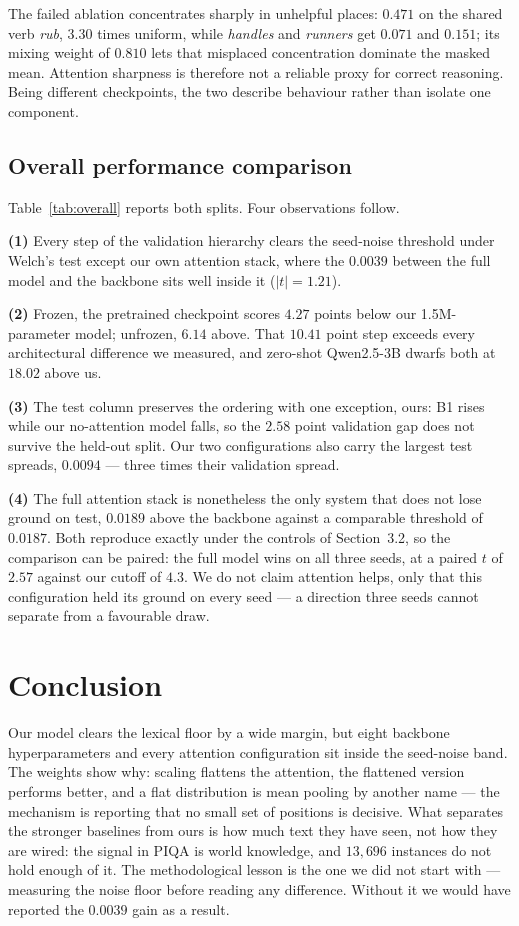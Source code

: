 \documentclass[11pt]{article}
\begin{document}
The failed ablation concentrates sharply in unhelpful places: $0.471$ on the
shared verb \emph{rub}, $3.30$ times uniform, while \emph{handles} and
\emph{runners} get $0.071$ and $0.151$; its mixing weight of $0.810$ lets that
misplaced concentration dominate the masked mean. Attention sharpness is
therefore not a reliable proxy for correct reasoning. Being different
checkpoints, the two describe behaviour rather than isolate one component.

\subsection{Overall performance comparison}

Table~\ref{tab:overall} reports both splits. Four observations follow.

\textbf{(1)} Every step of the validation hierarchy clears the seed-noise
threshold under Welch's test except our own attention stack, where the
$0.0039$ between the full model and the backbone sits well inside it
($|t|=1.21$).

\textbf{(2)} Frozen, the pretrained checkpoint scores $4.27$ points below our
1.5M-parameter model; unfrozen, $6.14$ above. That $10.41$ point step exceeds
every architectural difference we measured, and zero-shot Qwen2.5-3B dwarfs
both at $18.02$ above us.

\textbf{(3)} The test column preserves the ordering with one exception, ours:
B1 rises while our no-attention model falls, so the $2.58$ point validation
gap does not survive the held-out split. Our two configurations also carry
the largest test spreads, $0.0094$ --- three times their validation spread.

\textbf{(4)} The full attention stack is nonetheless the only system that
does not lose ground on test, $0.0189$ above the backbone against a comparable
threshold of $0.0187$. Both reproduce exactly under the controls of
Section~3.2, so the comparison can be paired: the full model wins on all three
seeds, at a paired $t$ of $2.57$ against our cutoff of $4.3$. We do not claim
attention helps, only that this configuration held its ground on every seed
--- a direction three seeds cannot separate from a favourable draw.

\section{Conclusion}

Our model clears the lexical floor by a wide margin, but eight backbone
hyperparameters and every attention configuration sit inside the seed-noise
band. The weights show why: scaling flattens the attention, the flattened
version performs better, and a flat distribution is mean pooling by another
name --- the mechanism is reporting that no small set of positions is
decisive. What separates the stronger baselines from ours is how much text
they have seen, not how they are wired: the signal in PIQA is world knowledge,
and $13{,}696$ instances do not hold enough of it. The methodological lesson
is the one we did not start with --- measuring the noise floor before reading
any difference. Without it we would have reported the $0.0039$ gain as a
result.
\end{document}
